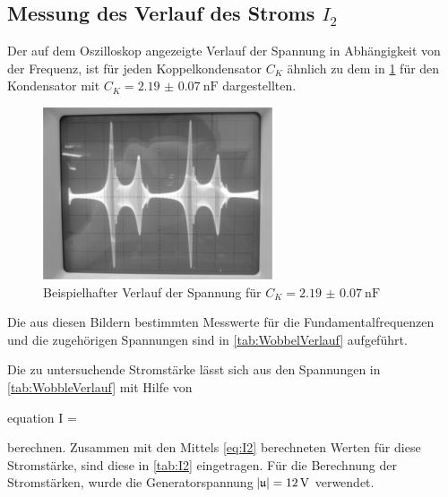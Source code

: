 	
	
\subsection{Messung des Verlauf des Stroms $I_{2}$}
	
	Der auf dem Oszilloskop angezeigte Verlauf der Spannung in Abhängigkeit von der Frequenz, ist für jeden 
	Koppelkondensator $C_{K}$ ähnlich zu dem in \cref{fig:WobbelVerlauf} für den Kondensator mit 
	$C_{K} = \SI{2.19(7)}{\nano\farad}$ dargestellten.
	
	\begin{figure}
		\centering
		\includegraphics{Grafiken/Kondensator2.jpg}
		\caption{Beispielhafter Verlauf der Spannung für $C_{K} = \SI{2.19(7)}{\nano\farad}$ }
		\label{fig:WobbelVerlauf}
	\end{figure}

	Die aus diesen Bildern bestimmten Messwerte für die Fundamentalfrequenzen und die zugehörigen Spannungen
	sind in \cref{tab:WobbelVerlauf} aufgeführt.  

	
	
	Die zu untersuchende Stromstärke lässt sich aus den Spannungen in \cref{tab:WobbleVerlauf} mit Hilfe von
	\begin{empheq}{equation}
		I =  
	\end{empheq}  
	berechnen. Zusammen mit den Mittels \cref{eq:I2} berechneten Werten für diese Stromstärke, sind diese in
	\cref{tab:I2} eingetragen. Für die Berechnung der Stromstärken, wurde die Generatorspannung $\envert{\mathfrak{u}} = \SI{12}{\volt}$ verwendet. 
	
	